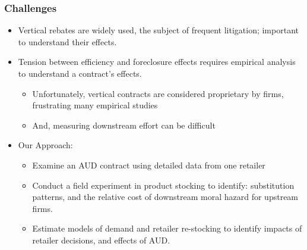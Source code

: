 \documentclass[aspectratio=169,11pt]{beamer}
\begin{document}
\begin{frame}\frametitle{Challenges}
\begin{itemize}
\item Vertical rebates are widely used, the subject of frequent litigation; important to understand their effects.
\item Tension between efficiency and foreclosure effects requires empirical analysis to understand a contract's effects.
\begin{itemize}
\item Unfortunately, vertical contracts are considered proprietary by firms, frustrating many empirical studies
\item And, measuring downstream effort can be difficult
\end{itemize}
\item Our Approach:
\begin{itemize}
\item Examine an AUD contract using detailed data from one retailer
\item Conduct a field experiment in product stocking to identify: substitution patterns, and the relative cost of downstream moral hazard for upstream firms.
\item Estimate models of demand and retailer re-stocking to identify impacts of retailer decisions, and effects of AUD.
\end{itemize}
\end{itemize}
\end{frame}
\end{document}
